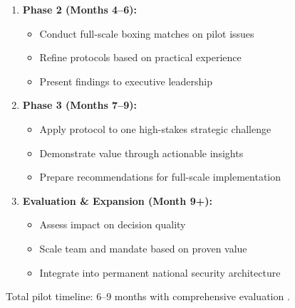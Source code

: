 \documentclass[11pt,a4paper]{article}
\begin{document}
\begin{small}
\begin{enumerate}
    \item \textbf{Phase 2 (Months 4--6):}
    \begin{itemize}[nosep]
        \item Conduct full-scale boxing matches on pilot issues
        \item Refine protocols based on practical experience
        \item Present findings to executive leadership
    \end{itemize}
    
    \item \textbf{Phase 3 (Months 7--9):}
    \begin{itemize}[nosep]
        \item Apply protocol to one high-stakes strategic challenge
        \item Demonstrate value through actionable insights
        \item Prepare recommendations for full-scale implementation
    \end{itemize}
    
    \item \textbf{Evaluation \& Expansion (Month 9+):}
    \begin{itemize}[nosep]
        \item Assess impact on decision quality
        \item Scale team and mandate based on proven value
        \item Integrate into permanent national security architecture
    \end{itemize}
\end{enumerate}

Total pilot timeline: 6--9 months with comprehensive evaluation \citep[lines 1199, 1341]{AnalyticalReport2025}.

\begin{figure}[h!]
\centering
{}
\end{figure}
\end{small}
\end{document}
